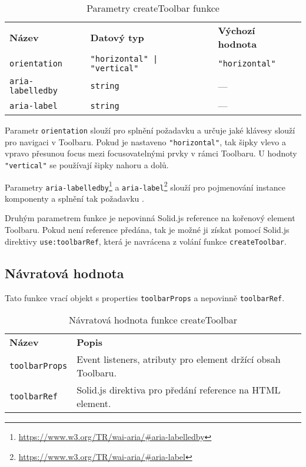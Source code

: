 \begin{table}[ht]
    \begin{ctucolortab}
        \begin{tabularx}{\textwidth}{X X X}
            \bfseries Název          & \bfseries Datový typ               & \bfseries Výchozí hodnota \\\Midrule{}
            \texttt{orientation}     & \texttt{"horizontal" | "vertical"} & \texttt{"horizontal"}     \\
            \texttt{aria-labelledby} & \texttt{string}                    & ---                       \\
            \texttt{aria-label}      & \texttt{string}                    & ---
        \end{tabularx}
    \end{ctucolortab}
    \caption{Parametry createToolbar funkce}
    \label{table:toolbar-params}
\end{table}

Parametr \texttt{orientation} slouží pro splnění požadavku \hyperref[tfr12]{} a určuje jaké klávesy slouží pro navigaci v Toolbaru.
Pokud je nastaveno \texttt{"horizontal"}, tak šipky vlevo a vpravo přesunou focus mezi focusovatelnými prvky v rámci Toolbaru.
U hodnoty \texttt{"vertical"} se používají šipky nahoru a dolů.

Parametry \texttt{aria-labelledby}\footnote{\url{https://www.w3.org/TR/wai-aria/\#aria-labelledby}} a \texttt{aria-label}\footnote{\url{https://www.w3.org/TR/wai-aria/\#aria-label}} slouží pro pojmenování instance komponenty a splnění tak požadavku \href{ofr13}{}.

Druhým parametrem funkce je nepovinná Solid.js reference na kořenový element Toolbaru.
Pokud není reference předána, tak je možné ji získat pomocí Solid.js direktivy \texttt{use:toolbarRef}, která je navrácena z volání funkce \texttt{createToolbar}.

\subsection{Návratová hodnota}

Tato funkce vrací objekt s properties \texttt{toolbarProps} a nepovinně \texttt{toolbarRef}.

\begin{table}[ht]\label{table:toolbar-return}
    \begin{ctucolortab}
        \begin{tabularx}{\textwidth}{p{3cm} X}
            \bfseries Název       & \bfseries Popis                                              \\\Midrule{}
            \texttt{toolbarProps} & Event listeners, atributy pro element držící obsah Toolbaru. \\
            \texttt{toolbarRef}   & Solid.js direktiva pro předání reference na HTML element.
        \end{tabularx}
    \end{ctucolortab}
    \caption{Návratová hodnota funkce createToolbar}
\end{table}

